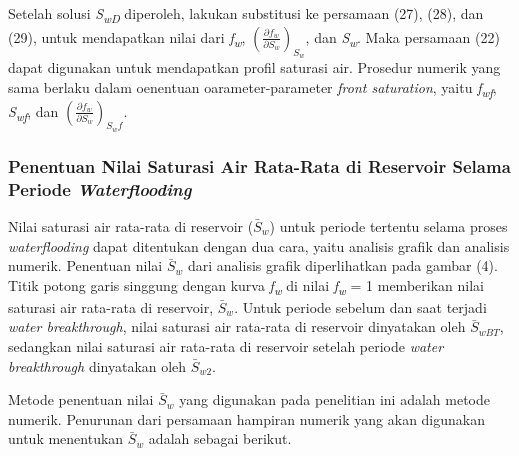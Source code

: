 \documentclass[
]{book}
\begin{document}
~

Setelah solusi \emph{S\textsubscript{wD}} diperoleh, lakukan substitusi ke persamaan (27), (28), dan (29), untuk mendapatkan nilai dari \emph{f\textsubscript{w}}, \(\left( \frac{\partial f_w}{\partial S_w} \right)_{S_w}\), dan \emph{S\textsubscript{w}}. Maka persamaan (22) dapat digunakan untuk mendapatkan profil saturasi air. Prosedur numerik yang sama berlaku dalam oenentuan oarameter-parameter \emph{front saturation}, yaitu \emph{f\textsubscript{wf}}, \emph{S\textsubscript{wf}}, dan \(\left( \frac{\partial f_w}{\partial S_w} \right)_{S_wf}\).

\hypertarget{penentuan-nilai-saturasi-air-rata-rata-di-reservoir-selama-periode-waterflooding}{%
\subsubsection{\texorpdfstring{Penentuan Nilai Saturasi Air Rata-Rata di Reservoir Selama Periode \emph{Waterflooding}}{Penentuan Nilai Saturasi Air Rata-Rata di Reservoir Selama Periode Waterflooding}}\label{penentuan-nilai-saturasi-air-rata-rata-di-reservoir-selama-periode-waterflooding}}

Nilai saturasi air rata-rata di reservoir (\(\bar S_w\)) untuk periode tertentu selama proses \emph{waterflooding} dapat ditentukan dengan dua cara, yaitu analisis grafik dan analisis numerik. Penentuan nilai \(\bar S_w\) dari analisis grafik diperlihatkan pada gambar (4). Titik potong garis singgung dengan kurva \emph{f\textsubscript{w}} di nilai \emph{f\textsubscript{w}} = 1 memberikan nilai saturasi air rata-rata di reservoir, \(\bar S_w\). Untuk periode sebelum dan saat terjadi \emph{water breakthrough}, nilai saturasi air rata-rata di reservoir dinyatakan oleh \(\bar S_{wBT}\), sedangkan nilai saturasi air rata-rata di reservoir setelah periode \emph{water breakthrough} dinyatakan oleh \(\bar S_{w2}\).

Metode penentuan nilai \(\bar S_w\) yang digunakan pada penelitian ini adalah metode numerik. Penurunan dari persamaan hampiran numerik yang akan digunakan untuk menentukan \(\bar S_w\) adalah sebagai berikut.
\end{document}
